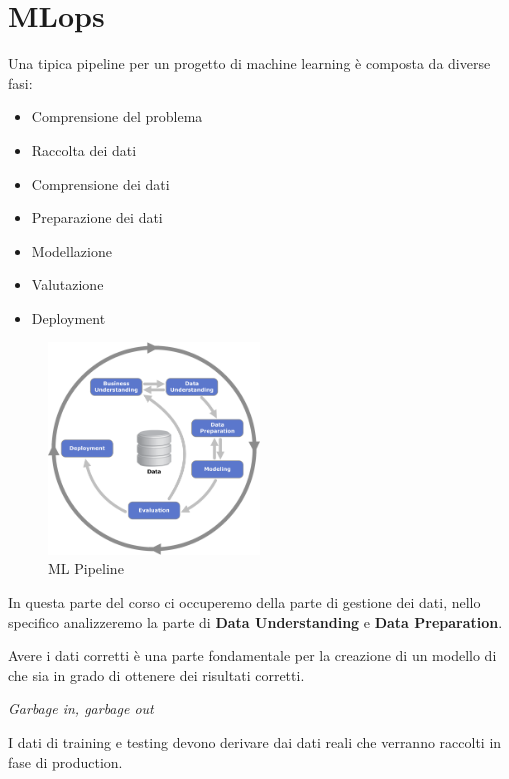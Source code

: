 \chapter{MLops}
Una tipica pipeline per un progetto di machine learning è composta da diverse fasi:
\begin{itemize}
    \item Comprensione del problema
    \item Raccolta dei dati
    \item Comprensione dei dati
    \item Preparazione dei dati
    \item Modellazione
    \item Valutazione
    \item Deployment
\end{itemize}
\begin{figure}[!ht]
    \centering
    \includegraphics[width=0.5\textwidth]{./img/MLops/CRISP-DM.png}
    \caption{ML Pipeline}
    \label{fig:ml_pipeline}
\end{figure}
In questa parte del corso ci occuperemo della parte di gestione dei dati, nello
specifico analizzeremo la parte di \textbf{Data Understanding} e \textbf{Data
    Preparation}.

Avere i dati corretti è una parte fondamentale per la creazione di un modello di
che sia in grado di ottenere dei risultati corretti.
\begin{center}
    \textit{Garbage in, garbage out}
\end{center}
I dati di training e testing devono derivare dai dati reali che verranno raccolti
in fase di production.
